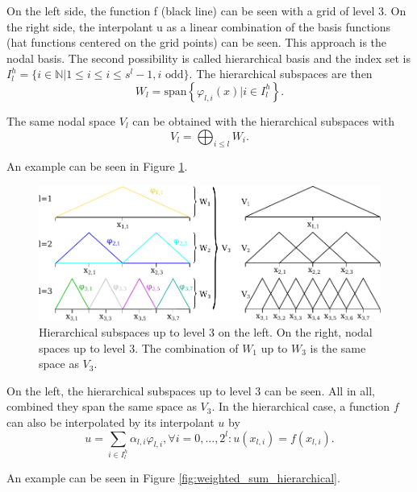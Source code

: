 On the left side, the function f (black line) can be seen with a grid of level 3. On the right side, the interpolant u as a linear combination of the basis functions (hat functions centered on the grid points) can be seen. This approach is the nodal basis. The second possibility is called hierarchical basis and the index set is $I_l^h = \{i \in \mathbb{N} | 1 \le i \le i \le s^l-1, i \text{ odd}\}$. The hierarchical subspaces are then 
\begin{equation}
	W_l = \text{span}\left\{ \varphi_{l,i}(x) | i \in I_l^h\right\}.
\end{equation}

The same nodal space $ V_l $ can be obtained with the hierarchical subspaces with 
\begin{equation}
	V_l = \bigoplus_{i \le l} W_i.
\end{equation}

An example can be seen in Figure \ref{fig:hierarchical_basis}.
\begin{figure}[H]
	\centering
	\includegraphics[width=\textwidth]{figures/Fig_2_6_hierarchical_subspaces}
	\caption{ Hierarchical subspaces up to level 3 on the left. On the right, nodal spaces up to level 3. The combination of $ W_1 $ up to $ W_3 $ is the same space as $ V_3 $. }
	\label{fig:hierarchical_basis}
\end{figure}

On the left, the hierarchical subspaces up to level 3 can be seen. All in all, combined they span the same space as $ V_3 $. In the hierarchical case, a function $ f $ can also be interpolated by its interpolant $ u $ by 
\begin{equation}
	u = \sum_{i \in I_l^h}\alpha_{l,i} \varphi_{l,i}, \forall i = 0,...,2^l: u(x_{l,i}) = f(x_{l,i}).
\end{equation}

An example can be seen in Figure \ref{fig:weighted_sum_hierarchical}.

